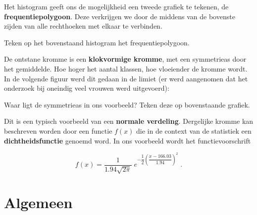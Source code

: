 \documentclass[12pt,twoside,a4paper]{article}
\begin{document}
Het histogram geeft ons de mogelijkheid een tweede grafiek te tekenen, de {\bf frequentiepolygoon}. Deze verkrijgen we door de middens van de bovenste zijden van alle rechthoeken met elkaar te verbinden.

\begin{oefening}
Teken op het bovenstaand histogram het frequentiepolygoon.
\end{oefening}

De ontstane kromme is een {\bf klokvormige kromme}, met een symmetrieas door het gemiddelde. Hoe hoger het aantal klassen, hoe vloeiender de kromme wordt. In de volgende figuur werd dit gedaan in de limiet (er werd aangenomen dat het onderzoek bij oneindig veel vrouwen werd uitgevoerd):

\begin{center}
\end{center}

\begin{oefening}
Waar ligt de symmetrieas in ons voorbeeld? \arule{4cm} Teken deze op bovenstaande grafiek.
\end{oefening}

Dit is een typisch voorbeeld van een {\bf normale verdeling}. Dergelijke kromme kan beschreven worden door een functie $f(x)$ die in de context van de statistiek een {\bf dichtheidsfunctie} genoemd word. In ons voorbeeld wordt het functievoorschrift

$$f(x)=\dfrac{1}{1.94\sqrt{2\pi}}\;e^{-\dfrac{1}{2}\left(\dfrac{x-166.03}{1.94}\right)^2}\;.$$

\cleardoublepage
\section{Algemeen}
\end{document}
